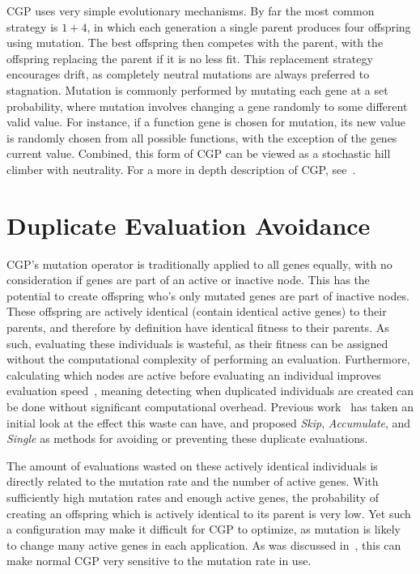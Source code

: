 \documentclass[journal]{IEEEtran}
\begin{document}
CGP uses very simple evolutionary mechanisms.  By far the most common strategy
is $1+4$, in which each generation a single parent produces four offspring using
mutation.  The best offspring then competes with the parent, with the offspring
replacing the parent if it is no less fit.  This replacement strategy encourages
drift, as completely neutral mutations are always preferred to stagnation.  Mutation
is commonly performed by mutating each gene at a set probability, where mutation
involves changing a gene randomly to some different valid value.  For instance,
if a function gene is chosen for mutation, its new value is randomly chosen from
all possible functions, with the exception of the genes current value.  Combined,
this form of CGP can be viewed as a stochastic hill climber with neutrality.
For a more in depth description of CGP, see~\cite{miller:2011:chapter2}.

\section{Duplicate Evaluation Avoidance}
\label{sec:duplicate}
CGP's mutation operator is traditionally applied to all genes equally, with no
consideration if genes are part of an active or inactive node.  This has the
potential to create offspring who's only mutated genes are part of inactive nodes.
These offspring are actively identical (contain identical active genes) to their
parents, and therefore by definition have identical fitness to their parents.
As such, evaluating these individuals is wasteful, as their fitness can be
assigned without the computational complexity of performing an evaluation.
Furthermore, calculating which nodes are active before evaluating an individual
improves evaluation speed~\cite{vasicek:2012:efficient}, meaning detecting when duplicated individuals are
created can be done without significant computational overhead.
Previous work~\cite{goldman:2013:cgpwaste} has taken an initial look at the
effect this waste can have, and proposed \emph{Skip}, \emph{Accumulate}, and
\emph{Single} as methods for avoiding or preventing these duplicate evaluations.

The amount of evaluations wasted on these actively identical individuals is
directly related to the mutation rate and the number of active genes.  With
sufficiently high mutation rates and enough active genes, the probability of
creating an offspring which is actively identical to its parent is very low.
Yet such a configuration may make it difficult for CGP to optimize, as mutation
is likely to change many active genes in each application.  As was discussed
in~\cite{goldman:2013:cgpwaste}, this can make normal CGP very sensitive to the
mutation rate in use.
\end{document}
